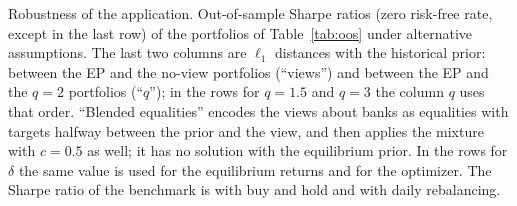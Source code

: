 \documentclass[11pt]{article}
\begin{document}
\begin{table}[h]
\centering
\footnotesize
\caption{Robustness of the application. Out-of-sample Sharpe ratios (zero
risk-free rate, except in the last row) of the portfolios of
Table~\ref{tab:oos} under alternative assumptions. The last two columns are $\ell_1$ distances with the
historical prior: between the EP and the no-view portfolios (``views'') and
between the EP and the $q=2$ portfolios (``$q$''); in the rows for
$q = 1.5$ and $q=3$ the column $q$ uses that order. ``Blended equalities''
encodes the views about banks as equalities with targets halfway between
the prior and the view, and then applies the mixture with $c=0.5$ as well;
it has no solution with the equilibrium prior. In the rows for $\delta$ the
same value is used for the equilibrium returns and for the optimizer. The
Sharpe ratio of the benchmark is \nShBench{} with buy and hold and
\nShBenchDaily{} with daily rebalancing.}
\label{tab:robust}

\end{table}
\end{document}
